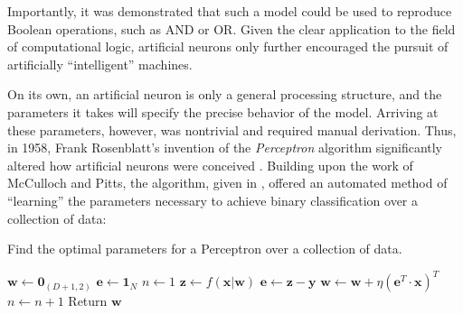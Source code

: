 \noindent Importantly,
it was demonstrated that such a model could be used to reproduce Boolean operations, such as AND or OR.
Given the clear application to the field of computational logic, artificial neurons only further encouraged the pursuit of artificially ``intelligent'' machines.

On its own, an artificial neuron is only a general processing structure, and the parameters it takes will specify the precise behavior of the model.
Arriving at these parameters, however, was nontrivial and required manual derivation.
Thus, in 1958, Frank Rosenblatt's invention of the \emph{Perceptron} algorithm significantly altered how artificial neurons were conceived \cite{Rosenblatt1958Perceptron}.
Building upon the work of McCulloch and Pitts, the algorithm, given in , offered an automated method of ``learning'' the parameters necessary to achieve binary classification over a collection of data:

\begin{algorithm}[H]
\caption{Find the optimal parameters for a Perceptron over a collection of data.}
\label{alg:perceptron}
\small
\begin{algorithmic}[1]
    \State $\mathbf{w} \gets \mathbf{0}_{(D + 1, 2)}$
    \State $\mathbf{e} \gets \mathbf{1}_{N}$
    \State $n \gets 1$
        \State $\mathbf{z} \gets f(\mathbf{x} | \mathbf{w})$
        \State $\mathbf{e} \gets \mathbf{z} - \mathbf{y}$
        \State $\mathbf{w} \gets \mathbf{w} + \eta (\mathbf{e}^T \cdot \mathbf{x})^T$
        \State $n \gets n + 1$
    \EndWhile
    \State Return $\mathbf{w}$
\EndProcedure
\end{algorithmic}
\end{algorithm}

